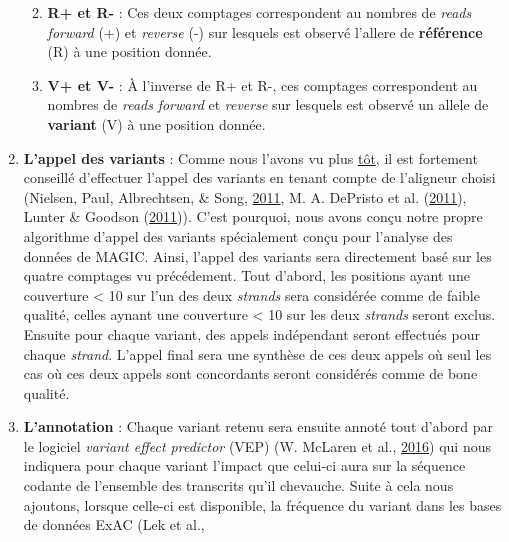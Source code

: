 \documentclass[12pt,twoside]{reedthesis}
\providecommand{\tightlist}{%
  \setlength{\itemsep}{0pt}\setlength{\parskip}{0pt}}
\theoremstyle{definition}
\theoremstyle{definition}
\theoremstyle{remark}
\begin{document}
\begin{enumerate}
    \begin{enumerate}
    \def\labelenumii{\alph{enumii}.}
    \tightlist
    \item
      \textbf{R+ et R-} : Ces deux comptages correspondent au nombres de
      \emph{reads} \emph{forward} (+) et \emph{reverse} (-) sur lesquels
      est observé l'allere de \textbf{référence} (R) à une position
      donnée.\\
    \item
      \textbf{V+ et V-} : À l'inverse de R+ et R-, ces comptages
      correspondent au nombres de \emph{reads} \emph{forward} et
      \emph{reverse} sur lesquels est observé un allele de
      \textbf{variant} (V) à une position donnée.\\
    \end{enumerate}
  \item
    \textbf{L'appel des variants} : Comme nous l'avons vu plus
    \protect\hyperlink{varcall}{tôt}, il est fortement conseillé
    d'effectuer l'appel des variants en tenant compte de l'aligneur choisi
    (Nielsen, Paul, Albrechtsen, \& Song,
    \protect\hyperlink{ref-Nielsen2011}{2011}, M. A. DePristo et al.
    (\protect\hyperlink{ref-DePristo2011}{2011}), Lunter \& Goodson
    (\protect\hyperlink{ref-Lunter2011}{2011})). C'est pourquoi, nous
    avons conçu notre propre algorithme d'appel des variants spécialement
    conçu pour l'analyse des données de MAGIC. Ainsi, l'appel des variants
    sera directement basé sur les quatre comptages vu précédement. Tout
    d'abord, les positions ayant une couverture \textless{} 10 sur l'un
    des deux \emph{strands} sera considérée comme de faible qualité,
    celles aynant une couverture \textless{} 10 sur les deux
    \emph{strands} seront exclus. Ensuite pour chaque variant, des appels
    indépendant seront effectués pour chaque \emph{strand}. L'appel final
    sera une synthèse de ces deux appels où seul les cas où ces deux
    appels sont concordants seront considérés comme de bone qualité.\\
  \item
    \textbf{L'annotation} : Chaque variant retenu sera ensuite annoté tout
    d'abord par le logiciel \emph{variant effect predictor} (VEP) (W.
    McLaren et al., \protect\hyperlink{ref-McLaren2016}{2016}) qui nous
    indiquera pour chaque variant l'impact que celui-ci aura sur la
    séquence codante de l'ensemble des transcrits qu'il chevauche. Suite à
    cela nous ajoutons, lorsque celle-ci est disponible, la fréquence du
    variant dans les bases de données ExAC (Lek et al.,

\end{enumerate}
\end{document}

